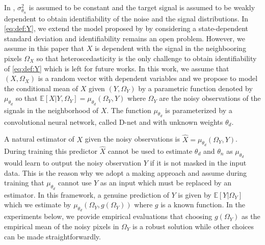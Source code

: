 \documentclass{article}
\begin{document}
In \cite{gassiat:lecorff:lehericy:2021}, $\sigma^2_{\theta_n}$ is assumed to be constant and the target signal is assumed to be weakly dependent to obtain identifiability of the noise and the signal  distributions. %
In \eqref{eq:def:Y}, we extend the model  proposed by \cite{gassiat:lecorff:lehericy:2021} by considering a state-dependent standard deviation and identifiability remains an open problem. However, we assume in this paper that $X$ is dependent with the signal in the neighbooring pixels $\Omega_X$ so that heteroscedasticity is the only challenge to obtain identifiability of \eqref{eq:def:Y} which is left for future works.
In this work, we assume that $(X,\Omega_X)$ is a random vector with dependent variables and we propose to model the conditional mean of $X$ given $(Y,\Omega_Y)$ by a parametric function denoted by $\mu_{\theta_d}$ so that $\mathbb{E}[X|Y,\Omega_Y] = \mu_{\theta_d}(\Omega_Y,Y)$ where $\Omega_Y$ are the noisy observations of the signals in the neighborhood of $X$. The function $ \mu_{\theta_d}$ is parameterized by a convolutional neural network, called D-net and with unknown weights $\theta_d$.

A natural estimator of $X$ given the noisy observations is $\widehat X = \mu_{\theta_d}(\Omega_Y,Y)$.
During training this predictor $\widehat X$ cannot be used to estimate $\theta_d$ and $\theta_n$ as $\mu_{\theta_d}$ would learn to output the noisy observation $Y$ if it is not masked in the input data.
This is the reason why we adopt a making approach and assume during training that $\mu_{\theta_d}$ cannot use $Y$ as an input which must be replaced by an estimator.
In this framework, a genuine prediction of $Y$ is given by $\mathbb{E}[Y|\Omega_Y]$ which we estimate by $\mu_{\theta_d}(\Omega_Y,g(\Omega_Y))$ where $g$ is a known function. %
In the experiments below, we provide empirical evaluations that choosing $g(\Omega_Y)$ as the empirical mean of the noisy pixels in $\Omega_Y$ is a robust solution while other choices can be made straightforwardly.
\end{document}

